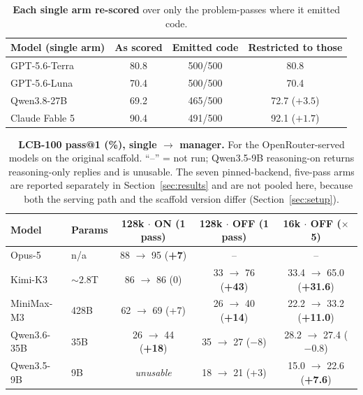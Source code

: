 \documentclass{article}
\begin{document}
\begin{table}[htbp]
\centering
\caption{\textbf{Each single arm re-scored} over only the problem-passes where it emitted code.}
\label{tab:emitted}
\small
\begin{tabular}{@{}lccc@{}}
\toprule
\textbf{Model (single arm)} & \textbf{As scored} & \textbf{Emitted code} &
\textbf{Restricted to those} \\
\midrule
GPT-5.6-Terra  & 80.8 & 500/500 & 80.8 \\
GPT-5.6-Luna   & 70.4 & 500/500 & 70.4 \\
Qwen3.8-27B    & 69.2 & 465/500 & 72.7 ($+3.5$) \\
Claude Fable 5 & 90.4 & 491/500 & 92.1 ($+1.7$) \\
\bottomrule
\end{tabular}
\end{table}

\begin{table}[htbp]
\centering
\caption{\textbf{LCB-100 pass@1 (\%), single $\to$ manager.} For the OpenRouter-served models on the
original scaffold. ``--'' = not run; Qwen3.5-9B reasoning-on returns reasoning-only replies and is
unusable. The seven pinned-backend, five-pass arms are reported separately in
Section~\ref{sec:results} and are not pooled here, because both the serving path and the scaffold
version differ (Section~\ref{sec:setup}).}
\label{tab:openrouter}
\small
\begin{tabular}{@{}llccc@{}}
\toprule
\textbf{Model} & \textbf{Params} & \textbf{128k $\cdot$ ON (1 pass)} &
\textbf{128k $\cdot$ OFF (1 pass)} & \textbf{16k $\cdot$ OFF ($\times$5)} \\
\midrule
Opus-5        & n/a            & 88 $\to$ 95 (\textbf{+7})            & --                      & -- \\
Kimi-K3       & ${\sim}2.8$T   & 86 $\to$ 86 (0)                      & 33 $\to$ 76 (\textbf{+43}) & 33.4 $\to$ 65.0 (\textbf{+31.6}) \\
MiniMax-M3    & 428B           & 62 $\to$ 69 (+7)                     & 26 $\to$ 40 (\textbf{+14}) & 22.2 $\to$ 33.2 (\textbf{+11.0}) \\
Qwen3.6-35B   & 35B            & 26 $\to$ 44 (\textbf{+18})           & 35 $\to$ 27 ($-8$)         & 28.2 $\to$ 27.4 ($-0.8$) \\
Qwen3.5-9B    & 9B             & \emph{unusable}                      & 18 $\to$ 21 (+3)           & 15.0 $\to$ 22.6 (\textbf{+7.6}) \\
\bottomrule
\end{tabular}
\end{table}
\end{document}
